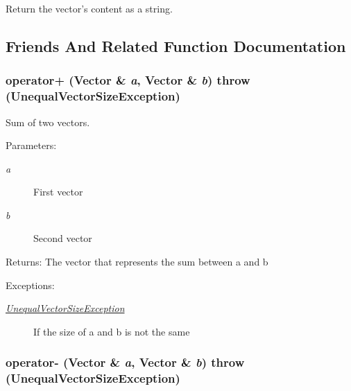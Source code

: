 Return the vector's content as a string. 



\subsection{Friends And Related Function Documentation}
\hypertarget{classgrassmann_1_1Vector_802964ed6ee76e3b82662c7b0bfa251a}{
\subsubsection[operator+]{ operator+ ({\bf Vector} \& {\em a}, \/  {\bf Vector} \& {\em b})  throw ({\bf UnequalVectorSizeException})}}
\label{classgrassmann_1_1Vector_802964ed6ee76e3b82662c7b0bfa251a}


Sum of two vectors. 

\begin{Desc}
\item[Parameters:]
\begin{description}
\item[{\em a}]First vector \item[{\em b}]Second vector \end{description}
\end{Desc}
\begin{Desc}
\item[Returns:]The vector that represents the sum between a and b \end{Desc}
\begin{Desc}
\item[Exceptions:]
\begin{description}
\item[{\em \hyperlink{classgrassmann_1_1UnequalVectorSizeException}{UnequalVectorSizeException}}]If the size of a and b is not the same \end{description}
\end{Desc}
\hypertarget{classgrassmann_1_1Vector_ac3997b0f5002019c4373e8f9005f85b}{
\subsubsection[operator-]{ operator- ({\bf Vector} \& {\em a}, \/  {\bf Vector} \& {\em b})  throw ({\bf UnequalVectorSizeException})}}
\label{classgrassmann_1_1Vector_ac3997b0f5002019c4373e8f9005f85b}


